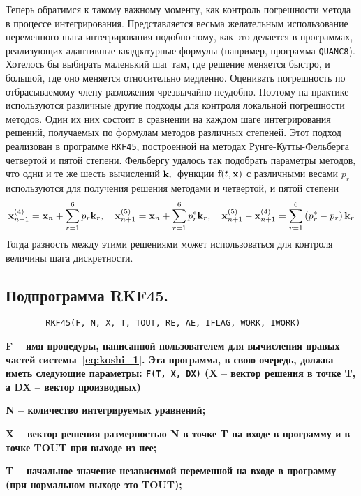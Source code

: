 Теперь обратимся к такому важному моменту, как контроль погрешности метода в процессе интегрирования. Представляется
весьма желательным использование переменного шага интегрирования подобно тому, как это делается в программах, реализующих
адаптивные квадратурные формулы (например, программа \verb|QUANC8|). Хотелось бы выбирать маленький шаг там, где решение
меняется быстро, и большой, где оно меняется относительно медленно. Оценивать погрешность по отбрасываемому члену
разложения чрезвычайно неудобно. Поэтому на практике используются различные другие подходы для контроля локальной
погрешности методов. Один их них состоит в сравнении на каждом шаге интегрирования решений, получаемых по формулам
методов различных степеней. Этот подход реализован в программе \verb|RKF45|, построенной на методах Рунге-Кутты-Фельберга
четвертой и пятой степени. Фельбергу удалось так подобрать параметры методов, что одни и те же шесть вычислений
$\bf{k}_r$ функции $\bf{f}(t, \bf{x})$ с различными весами $p_r$ используются для получения решения методами и четвертой,
и пятой степени
\begin{equation*}
    \bf{x}_{n+1}^{(4)} = \bf{x}_n + \sum_{r=1}^{6} p_r \bf{k}_r, \quad \bf{x}_{n+1}^{(5)} = \bf{x}_n + \sum_{r=1}^{6} p_r^* \bf{k}_r,
    \quad \bf{x}_{n+1}^{(5)} - \bf{x}_{n+1}^{(4)} = \sum_{r=1}^{6} \left( p_r^* - p_r \right)\bf{k}_r
\end{equation*}
Тогда разность между этими решениями может использоваться для контроля величины шага дискретности.

\subsection{Подпрограмма \textbf{RKF45}.}
\begin{verbatim}
        RKF45(F, N, X, T, TOUT, RE, AE, IFLAG, WORK, IWORK)
\end{verbatim}
\bf{F} -- имя процедуры, написанной пользователем для вычисления правых частей системы~\eqref{eq:koshi_1}. Эта программа,
в свою очередь, должна иметь следующие параметры: \verb|F(T, X, DX)| (\bf{X} -- вектор решения в точке \bf{T}, а \bf{DX} -- вектор производных)

\bf{N} -- количество интегрируемых уравнений;

\bf{X} -- вектор решения размерностью \bf{N} в точке \bf{T} на входе в программу и в точке \bf{TOUT} при выходе из нее;

\bf{T} -- начальное значение независимой переменной на входе в программу (при нормальном выходе это \bf{TOUT});

